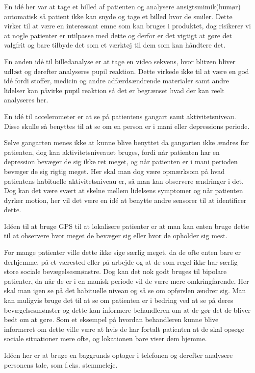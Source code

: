 \begin{description}[style=nextline]
\item[Billedanalyse]
	En idé her var at tage et billed af patienten og analysere ansigtsmimik(humør) automatisk så patient ikke kan snyde og tage et billed hvor de smiler.
	Dette virker til at være en interessant emne som kan bruges i produktet, dog risikerer vi at nogle patienter er utilpasse med dette og derfor er det vigtigt at gøre det valgfrit og bare tilbyde det som et værktøj til dem som kan håndtere det.
	
	En anden idé til billedanalyse er at tage en video sekvens, hvor blitzen bliver udløst og derefter analyseres pupil reaktion.
	Dette virkede ikke til at være en god idé fordi stoffer, medicin og andre adfærdsændrende materialer samt andre lidelser kan påvirke pupil reaktion så det er begrænset hvad der kan reelt analyseres her.
\item[Accelerometer]
	En idé til accelerometer er at se på patientens gangart samt aktivitetsniveau. Disse skulle så benyttes til at se om en person er i mani eller depressions periode.
	
	Selve gangarten menes ikke at kunne blive benyttet da gangarten ikke ændres for patienten, dog kan aktivitetsniveauet bruges, fordi når patienten har en depression bevæger de sig ikke ret meget, og når patienten er i mani perioden bevæger de sig rigtig meget. 
	Her skal man dog være opmærksom på hvad patientens habituelle aktivitetsniveau er, så man kan observere ændringer i det.
	Dog kan det være svært at skelne mellem lidelsens symptomer og når patienten dyrker motion, her vil det være en idé at benytte andre sensorer til at identificer dette.
\item[Lokation]
	Idéen til at bruge GPS til at lokalisere patienter er at man kan enten bruge dette til at observere hvor meget de bevæger sig eller hvor de opholder sig mest. 
	
	For mange patienter ville dette ikke sige særlig meget, da de ofte enten bare er derhjemme, på et værested eller på arbejde og at de som regel ikke har særlig store sociale bevægelsesmønstre. 
	Dog kan det nok godt bruges til bipolare patienter, da når de er i en manisk periode vil de være mere omkringfarende. 
	Her skal man igen se på det habituelle niveau og så se om opførslen ændrer sig. 
	Man kan muligvis bruge det til at se om patienten er i bedring ved at se på deres bevægelsesmønster og dette kan informere behandleren om at de gør det de bliver bedt om at gøre. 
	Som et eksempel på hvordan behandleren kunne blive informeret om dette ville være at hvis de har fortalt patienten at de skal opsøge sociale situationer mere ofte, og lokationen bare viser dem hjemme.
\item[Lyd]
	Idéen her er at bruge en baggrunds optager i telefonen og derefter analysere personens tale, som f.eks. stemmeleje. 
	

\end{description}
